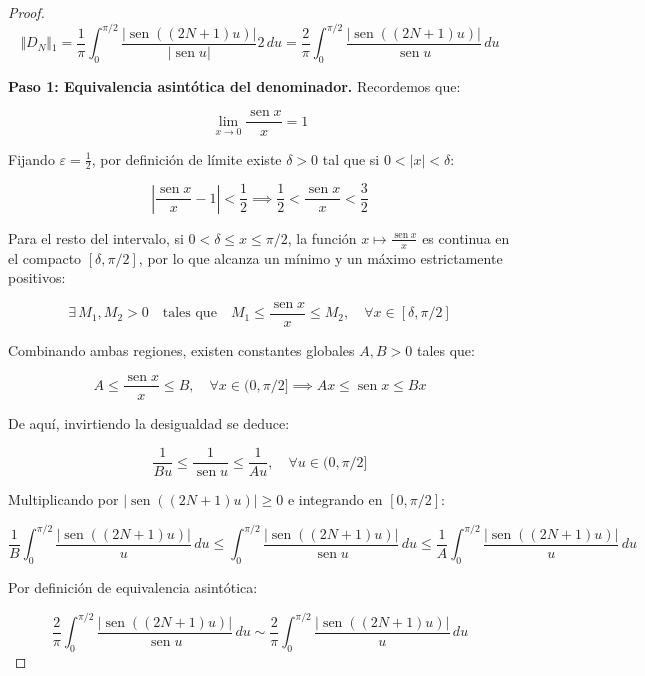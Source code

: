 \begin{proof}
$$\Vert{}D_N\Vert{}_1 = \frac{1}{\pi} \int_0^{\pi/2} \frac{\left\vert{}\operatorname{sen}\left((2N + 1)u\right)\right\vert{}}{\left\vert{}\operatorname{sen} u\right\vert{}} 2\,du = \frac{2}{\pi} \int_0^{\pi/2} \frac{\left\vert{}\operatorname{sen}\left((2N + 1)u\right)\right\vert{}}{\operatorname{sen} u} \, du$$

\medskip

\textbf{Paso 1: Equivalencia asintótica del denominador.}
Recordemos que:


$$\lim_{x \to 0} \frac{\operatorname{sen} x}{x} = 1$$

Fijando $\varepsilon = \frac{1}{2}$, por definición de límite existe $\delta > 0$ tal que si $0 < \vert{}x\vert{} < \delta$:


$$\left\vert{} \frac{\operatorname{sen} x}{x} - 1 \right\vert{} < \frac{1}{2} \implies \frac{1}{2} < \frac{\operatorname{sen} x}{x} < \frac{3}{2}$$

Para el resto del intervalo, si $0 < \delta \le x \le \pi/2$, la función $x \mapsto \frac{\operatorname{sen} x}{x}$ es continua en el compacto $[\delta, \pi/2]$, por lo que alcanza un mínimo y un máximo estrictamente positivos:


$$\exists\, M_1, M_2 > 0 \quad \text{tales que} \quad M_1 \le \frac{\operatorname{sen} x}{x} \le M_2, \quad \forall x \in [\delta, \pi/2]$$

Combinando ambas regiones, existen constantes globales $A, B > 0$ tales que:


$$A \le \frac{\operatorname{sen} x}{x} \le B, \quad \forall x \in (0, \pi/2] \implies Ax \le \operatorname{sen} x \le Bx$$

De aquí, invirtiendo la desigualdad se deduce:


$$\frac{1}{B u} \le \frac{1}{\operatorname{sen} u} \le \frac{1}{A u}, \quad \forall u \in (0, \pi/2]$$

Multiplicando por $\vert{}\operatorname{sen}((2N+1)u)\vert{} \ge 0$ e integrando en $[0, \pi/2]$:


$$\frac{1}{B} \int_0^{\pi/2} \frac{\vert{}\operatorname{sen}((2N+1)u)\vert{}}{u} \, du \le \int_0^{\pi/2} \frac{\vert{}\operatorname{sen}((2N+1)u)\vert{}}{\operatorname{sen} u} \, du \le \frac{1}{A} \int_0^{\pi/2} \frac{\vert{}\operatorname{sen}((2N+1)u)\vert{}}{u} \, du$$

Por definición de equivalencia asintótica:


$$\frac{2}{\pi} \int_0^{\pi/2} \frac{\vert{}\operatorname{sen}((2N + 1)u)\vert{}}{\operatorname{sen} u} \, du \sim \frac{2}{\pi} \int_0^{\pi/2} \frac{\vert{}\operatorname{sen}((2N + 1)u)\vert{}}{u} \, du$$


\end{proof}
